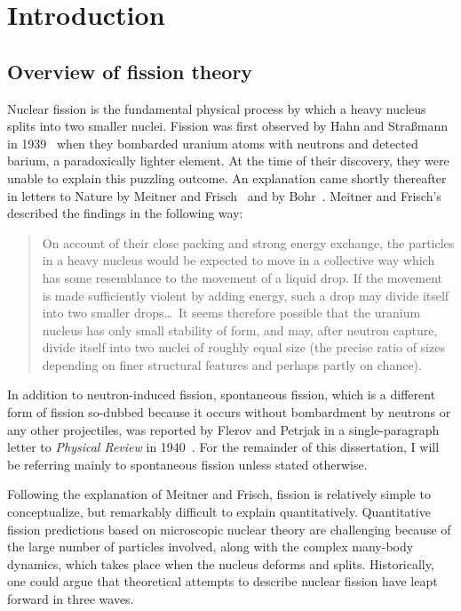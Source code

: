 \chapter{Introduction}\label{chap:Intro}

\section{Overview of fission theory}
Nuclear fission is the fundamental physical process by which a heavy nucleus splits into two smaller nuclei. Fission was first observed by Hahn and Stra\ss{}mann in 1939~\cite{Hahn1939} when they bombarded uranium atoms with neutrons and detected barium, a paradoxically lighter element. At the time of their discovery, they were unable to explain this puzzling outcome. An explanation came shortly thereafter in letters to Nature by Meitner and Frisch~\cite{Meitner1939b} and by Bohr~\cite{Bohr1939a}. Meitner and Frisch's described the findings in the following way:

\begin{quote}
On account of their close packing and strong energy exchange, the particles in a heavy nucleus would be expected to move in a collective way which has some resemblance to the movement of a liquid drop. If the movement is made sufficiently violent by adding energy, such a drop may divide itself into two smaller drops\dots \ It seems therefore possible that the uranium nucleus has only small stability of form, and may, after neutron capture, divide itself into two nuclei of roughly equal size (the precise ratio of sizes depending on finer structural features and perhaps partly on chance).
\end{quote}

\noindent In addition to neutron-induced fission, spontaneous fission, which is a different form of fission so-dubbed because it occurs without bombardment by neutrons or any other projectiles, was reported by Flerov and Petrjak in a single-paragraph letter to \textit{Physical Review} in 1940~\cite{Flerov1940}. For the remainder of this dissertation, I will be referring mainly to spontaneous fission unless stated otherwise.


Following the explanation of Meitner and Frisch, fission is relatively simple to conceptualize, but remarkably difficult to explain quantitatively. Quantitative fission predictions based on microscopic nuclear theory are challenging because of the large number of particles involved, along with the complex many-body dynamics, which takes place when the nucleus deforms and splits. Historically, one could argue that theoretical attempts to describe nuclear fission have leapt forward in three waves.

